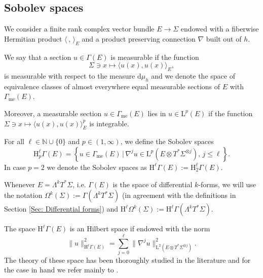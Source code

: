 \subsection{Sobolev spaces}

We consider a finite rank complex vector bundle $E\to \Sigma$ endowed with a fiberwise Hermitian product $\langle\,,\,\rangle_E$ and a product preserving connection $\nabla$ built out of $h$.

\begin{Definition}\label{Def: measurable and integrable}
	We say that a section $u\in\Gamma(E)$ is measurable if the function $$\Sigma\ni x\mapsto \langle u(x),u(x)\rangle_E,$$ is measurable with respect to the measure $\mathrm{d}\mu_h$ and we denote the space of equivalence classes of almost everywhere equal measurable sections of $E$ with $\Gamma_{\text{me}}(E)$.
	
	Moreover, a measurable section $u\in \Gamma_{\text{me}}(E)$ lies in $u\in\mathrm{L}^p(E)$ if the function $\Sigma\ni x\mapsto \langle u(x),u(x)\rangle_E^p$ is integrable.
\end{Definition}



\begin{Definition}\label{Def: Sobolev}
	For all $\ell\in\mathbb{N}\cup\{0\}$ and $p\in (1,\infty)$, we define the Sobolev spaces
	\begin{equation}\label{Eq: Sobolev space}
	\mathrm{H}_p^{\ell}\Gamma(E)=\left\{	u\in\Gamma_{\text{me}}(E)\,|\, \nabla^j u\in\mathrm{L}^p(E\otimes T^*\Sigma^{\otimes j}),\,j\leq\ell		\right\}.
	\end{equation}
	In case $p=2$ we denote the Sobolev spaces as $\mathrm{H}^{\ell}\Gamma(E):=\mathrm{H}^{\ell}_2\Gamma(E)$.
\end{Definition}

Whenever $E=\Lambda^kT^*\Sigma$, i.e. $\Gamma (E)$ is the space of differential $k$-forms, we will use the notation $\Omega^k(\Sigma):=\Gamma(\Lambda^kT^*\Sigma)$ (in agreement with the definitions in Section \ref{Sec: Differential forms}) and $\mathrm{H}^{\ell}\Omega^k(\Sigma):=\mathrm{H}^{\ell}\Gamma(\Lambda^kT^*\Sigma)$.

\begin{remark}
	The space $\mathrm{H}^\ell\Gamma(E)$ is an Hilbert space if endowed with the norm
	\begin{equation}
	\|u\|_{\mathrm{H}^{\ell}\Gamma(E)}^2=	\sum_{j=0}^{\ell}\|\nabla^j u\|^2_{\mathrm{L}^2(E\otimes T^*\Sigma^{\otimes j})}.	
	\end{equation}
	The theory of these space has been thoroughly studied in the literature and for the case in hand we refer mainly to \cite{Grosse-Schneider-13}.
\end{remark}

